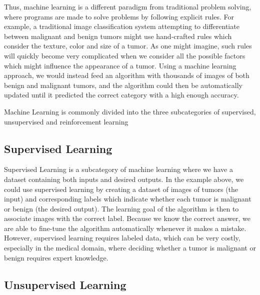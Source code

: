 \documentclass[UKenglish]{uiomasterthesis} %
\theoremstyle{definition}
\begin{document}
Thus, machine learning is a different paradigm from traditional problem solving, where programs are made to solve problems by following explicit rules. For example, a traditional image classification system attempting to differentiate between malignant and benign tumors might use hand-crafted rules which consider the texture, color and size of a tumor. As one might imagine, such rules will quickly become very complicated when we consider all the possible factors which might influence the appearance of a tumor. Using a machine learning approach, we would instead feed an algorithm with thousands of images of both benign and malignant tumors, and the algorithm could then be automatically updated until it predicted the correct category with a high enough accuracy.

Machine Learning is commonly divided into the three subcategories of supervised, unsupervised and reinforcement learning


\subsection{Supervised Learning}

Supervised Learning is a subcategory of machine learning where we have a dataset containing both inputs and desired outputs. In the example above, we could use supervised learning by creating a dataset of images of tumors (the input) and corresponding labels which indicate whether each tumor is malignant or benign (the desired output). The learning goal of the algorithm is then to associate images with the correct label. Because we know the correct answer, we are able to fine-tune the algorithm automatically whenever it makes a mistake. However, supervised learning requires labeled data, which can be very costly, especially in the medical domain, where deciding whether a tumor is malignant or benign requires expert knowledge.

\subsection{Unsupervised Learning}
\end{document}
